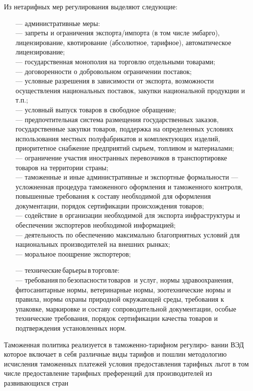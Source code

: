 Из нетарифных мер регулирования выделяют следующие:
\begin{enumerate}
	\item [---] административные меры:\\
	--- запреты и ограничения экспорта/импорта (в том числе эмбарго), лицензирование, квотирование (абсолютное, тарифное), автоматическое лицензирование;\\
	--- государственная монополия на торговлю отдельными товарами;\\
	--- договоренности о добровольном ограничении поставок;\\
	--- условные разрешения в зависимости от экспорта, возможности осуществления национальных поставок, закупки национальной продукции и т.п.;\\
	--- условный выпуск товаров  в свободное обращение;\\
	--- предпочтительная система размещения государственных заказов, государственные закупки товаров, поддержка на определенных условиях использования местных полуфабрикатов и комплектующих изделий, приоритетное снабжение предприятий сырьем, топливом и материалами;\\
	--- ограничение участия иностранных перевозчиков в транспортировке товаров на территории страны;\\
	--- таможенные и иные административные и экспортные формальности --- усложненная процедура таможенного оформления и таможенного контроля, повышенные требования к составу необходимой для оформления документации, порядок сертификации происхождения товаров;\\
	--- содействие в организации необходимой для экспорта инфраструктуры и обеспечении экспортеров необходимой информацией;\\
	--- деятельность по обеспечению максимально благоприятных условий для национальных производителей на внешних рынках;\\
	---  моральное поощрение экспортеров;
	\item [---] технические барьеры в торговле:\\
	--- требования по безопасности товаров  и услуг, нормы здравоохранения, фитосанитарные нормы, ветеринарные нормы, зоотехнические нормы и правила, нормы охраны природной окружающей среды, требования к упаковке, маркировке и составу сопроводительной документации, особые технические требования, порядок сертификации качества товаров и подтверждения установленных норм.
\end{enumerate}

Таможенная политика реализуется в таможенно-тарифном регулиро- вании ВЭД которое включает в себя различные виды тарифов и пошлин методологию исчисления таможенных платежей условия предоставления тарифных льгот в том числе предоставление тарифных преференций для производителей из развивающихся стран






